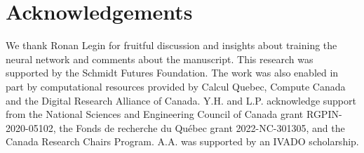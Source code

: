 \section*{Acknowledgements}
We thank Ronan Legin for fruitful discussion and insights about 
training the neural network and comments about the manuscript.
This research was supported by the Schmidt Futures Foundation. The work was also enabled in part by computational resources provided by Calcul Quebec, Compute Canada and the Digital Research Alliance of Canada. Y.H. and L.P. acknowledge support from the National Sciences and Engineering Council of Canada grant RGPIN-2020-05102, the Fonds de recherche du Québec grant 2022-NC-301305, and the Canada Research Chairs Program. A.A. was supported by an IVADO scholarship.

\clearpage
%




